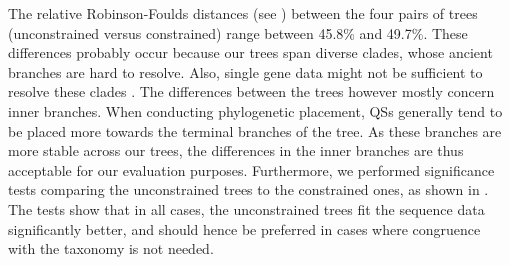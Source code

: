 The relative Robinson-Foulds distances \citep{Robinson1981}
(see )
between the four pairs of trees (unconstrained versus constrained) range between \num{45.8}\% and \num{49.7}\%.
These differences probably occur because our trees span diverse clades,
whose ancient branches are hard to resolve. %
Also, single gene data might not be sufficient to resolve these clades \cite{Kupczok2010}.
%
The differences between the trees however mostly concern inner branches.
When conducting phylogenetic placement,
\acp{QS} generally tend to be placed more towards the terminal branches of the tree.
As these branches are more stable across our trees,
the differences in the inner branches are thus acceptable for our evaluation purposes.
Furthermore, we performed significance tests comparing the unconstrained trees to the constrained ones,
as shown in .
The tests show that in all cases, the unconstrained trees fit the sequence data significantly better,
and should hence be preferred in cases where congruence with the taxonomy is not needed.

